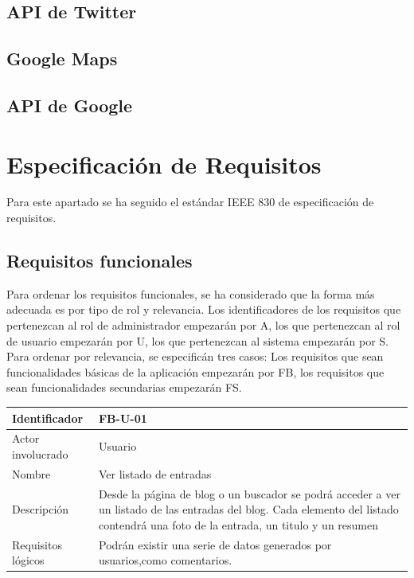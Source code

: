 \subsection{API de Twitter}

\subsection{Google Maps}

\subsection{API de Google}


\section{Especificación de Requisitos}

Para este apartado se ha seguido el estándar IEEE 830 de especificación de requisitos.

\subsection{Requisitos funcionales}

Para ordenar los requisitos funcionales, se ha considerado que la forma más adecuada es por tipo de rol y relevancia. Los identificadores de los requisitos que pertenezcan al rol de administrador empezarán por A, los que pertenezcan al rol de usuario empezarán por U, los que pertenezcan al sistema empezarán por S. Para ordenar por relevancia, se especificán tres casos: Los requisitos que sean funcionalidades básicas de la aplicación empezarán por FB, los requisitos que sean funcionalidades secundarias empezarán FS.


\begin{table}[h!]
\centering
\begin{tabular}{|p{3cm}|p{10cm}|}
\hline
Identificador & FB-U-01 \\ \hline
Actor involucrado & Usuario \\ \hline
Nombre & Ver listado de entradas \\ \hline
Descripción & Desde la página de blog o un buscador se podrá acceder a ver un listado de las entradas del blog. Cada elemento del listado contendrá una foto de la entrada, un titulo y un resumen \\ \hline
Requisitos lógicos & Podrán existir una serie de datos generados por usuarios,como comentarios. \\ \hline
\end{tabular}
\end{table}


